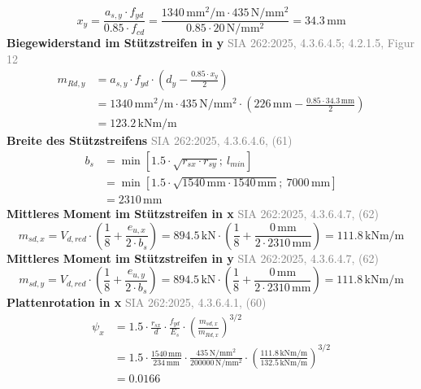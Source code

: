 \documentclass[11pt,a4paper]{article}
\newcommand{\normref}[1]{{\small\textcolor{gray}{#1}}}
\begin{document}
\begin{equation*}
x_y = \frac{a_{s,y} \cdot f_{yd}}{0.85 \cdot f_{cd}} = \frac{1340\,\mathrm{mm}^{2}/\mathrm{m} \cdot 435\,\mathrm{N}/\mathrm{mm}^{2}}{0.85 \cdot 20\,\mathrm{N}/\mathrm{mm}^{2}} = 34.3\,\mathrm{mm}
\end{equation*}
\noindent\textbf{Biegewiderstand im Stützstreifen in y} \hfill \normref{SIA 262:2025, 4.3.6.4.5; 4.2.1.5, Figur 12}
\begin{equation*}
\begin{aligned}
  m_{Rd,y} &= a_{s,y} \cdot f_{yd} \cdot \left(d_y - \frac{0.85 \cdot x_y}{2}\right) \\
  &= 1340\,\mathrm{mm}^{2}/\mathrm{m} \cdot 435\,\mathrm{N}/\mathrm{mm}^{2} \cdot \left(226\,\mathrm{mm} - \frac{0.85 \cdot 34.3\,\mathrm{mm}}{2}\right) \\
  &= 123.2\,\mathrm{kNm}/\mathrm{m}
\end{aligned}
\end{equation*}
\noindent\textbf{Breite des Stützstreifens} \hfill \normref{SIA 262:2025, 4.3.6.4.6, (61)}
\begin{equation*}
\begin{aligned}
  b_s &= \min\left[1.5 \cdot \sqrt{r_{sx} \cdot r_{sy}};\ l_{min}\right] \\
  &= \min\left[1.5 \cdot \sqrt{1540\,\mathrm{mm} \cdot 1540\,\mathrm{mm}};\ 7000\,\mathrm{mm}\right] \\
  &= 2310\,\mathrm{mm}
\end{aligned}
\end{equation*}
\noindent\textbf{Mittleres Moment im Stützstreifen in x} \hfill \normref{SIA 262:2025, 4.3.6.4.7, (62)}
\begin{equation*}
m_{sd,x} = V_{d,red} \cdot \left(\frac{1}{8} + \frac{e_{u,x}}{2 \cdot b_s}\right) = 894.5\,\mathrm{kN} \cdot \left(\frac{1}{8} + \frac{0\,\mathrm{mm}}{2 \cdot 2310\,\mathrm{mm}}\right) = 111.8\,\mathrm{kNm}/\mathrm{m}
\end{equation*}
\noindent\textbf{Mittleres Moment im Stützstreifen in y} \hfill \normref{SIA 262:2025, 4.3.6.4.7, (62)}
\begin{equation*}
m_{sd,y} = V_{d,red} \cdot \left(\frac{1}{8} + \frac{e_{u,y}}{2 \cdot b_s}\right) = 894.5\,\mathrm{kN} \cdot \left(\frac{1}{8} + \frac{0\,\mathrm{mm}}{2 \cdot 2310\,\mathrm{mm}}\right) = 111.8\,\mathrm{kNm}/\mathrm{m}
\end{equation*}
\noindent\textbf{Plattenrotation in x} \hfill \normref{SIA 262:2025, 4.3.6.4.1, (60)}
\begin{equation*}
\begin{aligned}
  \psi_x &= 1.5 \cdot \frac{r_{sx}}{d} \cdot \frac{f_{yd}}{E_s} \cdot \left(\frac{m_{sd,x}}{m_{Rd,x}}\right)^{3/2} \\
  &= 1.5 \cdot \frac{1540\,\mathrm{mm}}{234\,\mathrm{mm}} \cdot \frac{435\,\mathrm{N}/\mathrm{mm}^{2}}{200000\,\mathrm{N}/\mathrm{mm}^{2}} \cdot \left(\frac{111.8\,\mathrm{kNm}/\mathrm{m}}{132.5\,\mathrm{kNm}/\mathrm{m}}\right)^{3/2} \\
  &= 0.0166
\end{aligned}
\end{equation*}
\end{document}
